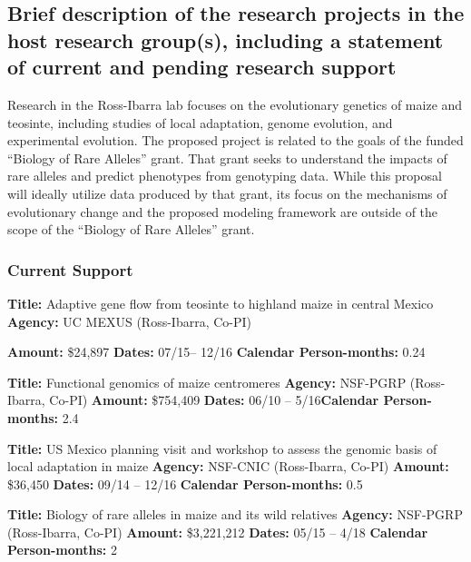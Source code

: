 \renewcommand{\thepage}{Sponsoring Scientist Statement - Page \arabic{page} of 3}

\subsection{Brief description of the research projects in the host research group(s), including a statement of current and pending research support} 

Research in the Ross-Ibarra lab focuses on the evolutionary genetics of maize and teosinte, including studies of local adaptation, genome evolution, and experimental evolution. The proposed project is related to the goals of the funded ``Biology of Rare Alleles'' grant.  That grant seeks to understand the impacts of rare alleles and predict phenotypes from genotyping data. While this proposal will ideally utilize data produced by that grant, its focus on the mechanisms of evolutionary change and the proposed modeling framework are outside of the scope of the ``Biology of Rare Alleles'' grant. 

\subsubsection*{Current Support}


\textbf{Title:} Adaptive gene flow from teosinte to highland maize in central Mexico
\textbf{Agency:} UC MEXUS (Ross-Ibarra, Co-PI)

\textbf{Amount:} \$24,897
\textbf{Dates:} 07/15– 12/16
\textbf{Calendar Person-months:} 0.24

\noindent\textbf{Title:} Functional genomics of maize centromeres 
\textbf{Agency:} NSF-PGRP (Ross-Ibarra, Co-PI)
\textbf{Amount:} \$754,409
\textbf{Dates:} 06/10 – 5/16\textbf{Calendar Person-months:} 2.4

\noindent\textbf{Title:} US Mexico planning visit and workshop to assess the genomic basis of local adaptation in maize 
\textbf{Agency:} NSF-CNIC (Ross-Ibarra, Co-PI)
\textbf{Amount:} \$36,450
\textbf{Dates:} 09/14 – 12/16
\textbf{Calendar Person-months:} 0.5

\textbf{Title:} Biology of rare alleles in maize and its wild relatives 
\textbf{Agency:} NSF-PGRP (Ross-Ibarra, Co-PI)
\textbf{Amount:} \$3,221,212
\textbf{Dates:} 05/15 – 4/18
\textbf{Calendar Person-months:} 2

